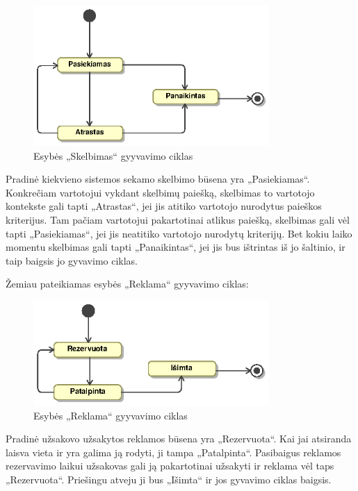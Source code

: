 \documentclass[12pt]{article}
\begin{document}
	\begin{figure}[h]
		\begin{center}
			\includegraphics[width=0.8\textwidth]{SkelbimoBusena.eps}
			\caption{Esybės „Skelbimas“ gyyvavimo ciklas\label{AdvertState}}
		\end{center}
	\end{figure}
	
	Pradinė kiekvieno sistemos sekamo skelbimo būsena yra „Pasiekiamas“. Konkrečiam vartotojui vykdant skelbimų paiešką, skelbimas to vartotojo kontekste gali tapti „Atrastas“, jei jis atitiko vartotojo nurodytus paieškos kriterijus. Tam pačiam vartotojui pakartotinai atlikus paiešką, skelbimas gali vėl tapti „Pasiekiamas“, jei jis neatitiko vartotojo nurodytų kriterijų. Bet kokiu laiko momentu skelbimas gali tapti „Panaikintas“, jei jis bus ištrintas iš jo šaltinio, ir taip baigsis jo gyvavimo ciklas.
	\pagebreak	
	
	Žemiau pateikiamas esybės „Reklama“ gyyvavimo ciklas:
	
	\begin{figure}[h]
		\begin{center}
			\includegraphics[width=0.8\textwidth]{ReklamosBusena.eps}
			\caption{Esybės „Reklama“ gyyvavimo ciklas\label{AdState}}
		\end{center}
	\end{figure}
	
	Pradinė užsakovo užsakytos reklamos būsena yra „Rezervuota“. Kai jai atsiranda laisva vieta ir yra galima ją rodyti, ji tampa „Patalpinta“. Pasibaigus reklamos rezervavimo laikui užsakovas gali ją pakartotinai užsakyti ir reklama vėl taps „Rezervuota“. Priešingu atveju ji bus „Išimta“ ir jos gyvavimo ciklas baigsis.
	\pagebreak	
	
\end{document}
